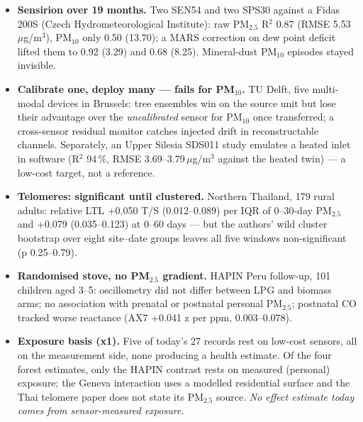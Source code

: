 \documentclass[10pt]{article}
\begin{document}
\footnotesize
\begin{itemize}

\item \textbf{Sensirion over 19 months.} Two SEN54 and two SPS30 against a Fidas 200S (Czech Hydrometeorological Institute): raw PM$_{2.5}$ R$^2$ 0.87 (RMSE 5.53\,$\mu$g/m$^3$), PM$_{10}$ only 0.50 (13.70); a MARS correction on dew point deficit lifted them to 0.92 (3.29) and 0.68 (8.25). Mineral-dust PM$_{10}$ episodes stayed invisible.

\item \textbf{Calibrate one, deploy many --- fails for PM$_{10}$.} TU Delft, five multi-modal devices in Brussels: tree ensembles win on the source unit but lose their advantage over the \emph{uncalibrated} sensor for PM$_{10}$ once transferred; a cross-sensor residual monitor catches injected drift in reconstructable channels. Separately, an Upper Silesia SDS011 study emulates a heated inlet in software (R$^2$ 94\,\%, RMSE 3.69--3.79\,$\mu$g/m$^3$ against the heated twin) --- a low-cost target, not a reference.

\item \textbf{Telomeres: significant until clustered.} Northern Thailand, 179 rural adults: relative LTL +0.050 T/S (0.012--0.089) per IQR of 0--30-day PM$_{2.5}$ and +0.079 (0.035--0.123) at 0--60 days --- but the authors' wild cluster bootstrap over eight site--date groups leaves all five windows non-significant (p 0.25--0.79).

\item \textbf{Randomised stove, no PM$_{2.5}$ gradient.} HAPIN Peru follow-up, 101 children aged 3--5: oscillometry did not differ between LPG and biomass arms; no association with prenatal or postnatal personal PM$_{2.5}$; postnatal CO tracked worse reactance (AX7 +0.041 z per ppm, 0.003--0.078).

\item \textbf{Exposure basis (x1).} Five of today's 27 records rest on low-cost sensors, all on the measurement side, none producing a health estimate. Of the four forest estimates, only the HAPIN contrast rests on measured (personal) exposure; the Geneva interaction uses a modelled residential surface and the Thai telomere paper does not state its PM$_{2.5}$ source. \emph{No effect estimate today comes from sensor-measured exposure.}

\end{itemize}

\vspace{2mm}
\end{document}
